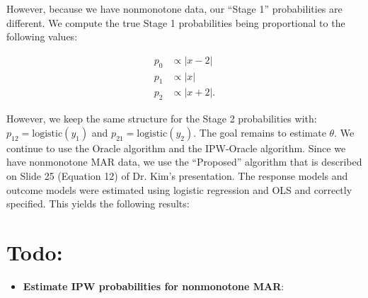 \documentclass[12pt]{article}
\newcommand{\logistic}{{\text{logistic}}}
\begin{document}
\begin{itemize}
    However, because we have nonmonotone data, our ``Stage 1'' probabilities are
    different. We compute the true Stage 1 probabilities being proportional to the
    following values:
    
    \begin{align*}
        p_0 &\propto |x - 2|\\
        p_1 &\propto |x|\\
        p_2 &\propto |x + 2|.
    \end{align*}
    
   However, we keep the same structure for the Stage 2 probabilities with: 
   $p_{12} = \logistic(y_1)$ and $p_{21} = \logistic(y_2)$. The goal remains to estimate
   $\theta$. We continue to use the Oracle algorithm and the IPW-Oracle algorithm. Since
   we have nonmonotone MAR data, we use the ``Proposed'' algorithm that is described 
   on Slide 25 (Equation 12) of Dr. Kim's presentation. The response models and outcome
   models were estimated using logistic regression and OLS and correctly specified.
   This yields the following results:
   
    
    
    

    \newpage
\end{itemize}

\section*{Todo:}

\begin{itemize}
    \item \textbf{Estimate IPW probabilities for nonmonotone MAR}:
\end{itemize}


\newpage

\printbibliography
\end{document}
